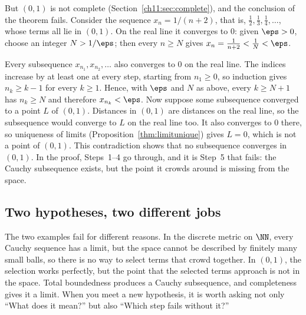 But $(0,1)$ is not complete (Section~\ref{ch11:sec:complete}), and the conclusion of the theorem fails. Consider the sequence $x_n=1/(n+2)$, that is, $\tfrac12,\tfrac13,\tfrac14,\ldots$, whose terms all lie in $(0,1)$. On the real line it converges to $0$: given $\eps>0$, choose an integer $N>1/\eps$; then every $n\ge N$ gives $x_n=\tfrac1{n+2}<\tfrac1N<\eps$.

Every subsequence $x_{n_1},x_{n_2},\ldots$ also converges to $0$ on the real line. The indices increase by at least one at every step, starting from $n_1\ge0$, so induction gives $n_k\ge k-1$ for every $k\ge1$. Hence, with $\eps$ and $N$ as above, every $k\ge N+1$ has $n_k\ge N$ and therefore $x_{n_k}<\eps$. Now suppose some subsequence converged to a point $L$ of $(0,1)$. Distances in $(0,1)$ are distances on the real line, so the subsequence would converge to $L$ on the real line too. It also converges to $0$ there, so uniqueness of limits (Proposition~\ref{thm:limitunique}) gives $L=0$, which is not a point of $(0,1)$. This contradiction shows that no subsequence converges in $(0,1)$. In the proof, Steps~1--4 go through, and it is Step~5 that fails: the Cauchy subsequence exists, but the point it crowds around is missing from the space.

\subsection*{Two hypotheses, two different jobs}
The two examples fail for different reasons. In the discrete metric on $\NN$, every Cauchy sequence has a limit, but the space cannot be described by finitely many small balls, so there is no way to select terms that crowd together. In $(0,1)$, the selection works perfectly, but the point that the selected terms approach is not in the space. Total boundedness produces a Cauchy subsequence, and completeness gives it a limit. When you meet a new hypothesis, it is worth asking not only ``What does it mean?'' but also ``Which step fails without it?''

